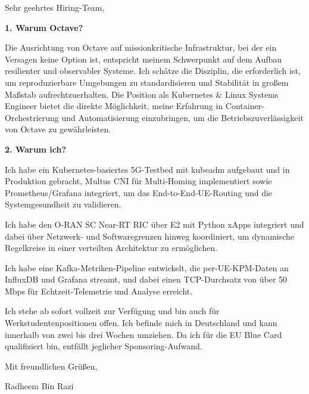 \documentclass[11pt,a4paper]{coverletter}
\begin{document}
\opening{Sehr geehrtes Hiring-Team,}

\vspace{8pt}\noindent\textbf{1. Warum Octave?}\par\vspace{3pt}

Die Ausrichtung von Octave auf missionkritische Infrastruktur, bei der ein Versagen keine Option ist, entspricht meinem Schwerpunkt auf dem Aufbau resilienter und observabler Systeme. Ich schätze die Disziplin, die erforderlich ist, um reproduzierbare Umgebungen zu standardisieren und Stabilität in großem Maßstab aufrechtzuerhalten. Die Position als Kubernetes \& Linux Systems Engineer bietet die direkte Möglichkeit, meine Erfahrung in Container-Orchestrierung und Automatisierung einzubringen, um die Betriebszuverlässigkeit von Octave zu gewährleisten.

\vspace{8pt}\noindent\textbf{2. Warum ich?}\par\vspace{3pt}

\bullets

  \item Ich habe ein Kubernetes-basiertes 5G-Testbed mit kubeadm aufgebaut und in Produktion gebracht, Multus CNI für Multi-Homing implementiert sowie Prometheus/Grafana integriert, um das End-to-End-UE-Routing und die Systemgesundheit zu validieren.

  \item Ich habe den O-RAN SC Near-RT RIC über E2 mit Python xApps integriert und dabei über Netzwerk- und Softwaregrenzen hinweg koordiniert, um dynamische Regelkreise in einer verteilten Architektur zu ermöglichen.

  \item Ich habe eine Kafka-Metriken-Pipeline entwickelt, die per-UE-KPM-Daten an InfluxDB und Grafana streamt, und dabei einen TCP-Durchsatz von über 50 Mbps für Echtzeit-Telemetrie und Analyse erreicht.

\bulletsend

Ich stehe ab sofort vollzeit zur Verfügung und bin auch für Werkstudentenpositionen offen. Ich befinde mich in Deutschland und kann innerhalb von zwei bis drei Wochen umziehen. Da ich für die EU Blue Card qualifiziert bin, entfällt jeglicher Sponsoring-Aufwand.

\closing{Mit freundlichen Grüßen,}{Radheem Bin Razi}
\end{document}
